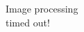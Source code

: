 \documentclass[varwidth, margin=20pt]{standalone}
\begin{document}
\pagecolor{magenta}
\begin{center}\color{black}
    Image processing\\
    timed out!
\end{center}
\end{document}
